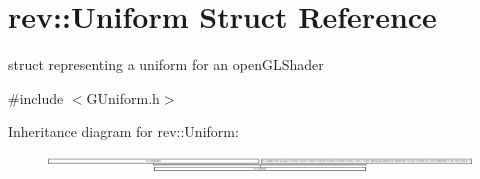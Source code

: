 \hypertarget{structrev_1_1_uniform}{}\section{rev\+::Uniform Struct Reference}
\label{structrev_1_1_uniform}


struct representing a uniform for an open\+G\+L\+Shader  




{\ttfamily \#include $<$G\+Uniform.\+h$>$}

Inheritance diagram for rev\+::Uniform\+:\begin{figure}[H]
\begin{center}
\leavevmode
\includegraphics[height=0.422323cm]{structrev_1_1_uniform}
\end{center}
\end{figure}
